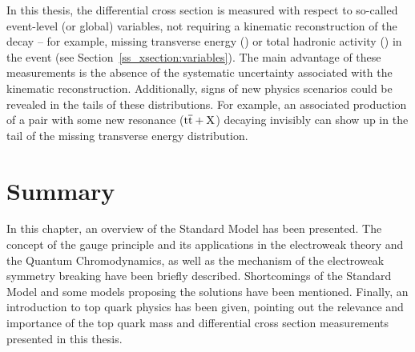 In this thesis, the \ttbar differential cross section is measured with respect to so-called event-level (or global)
variables, not requiring a kinematic reconstruction of the \ttbar decay -- for example, missing transverse energy (\MET)
or total hadronic activity (\HT) in the event (see Section~\ref{ss_xsection:variables}). The main advantage of these
measurements is the absence of the systematic uncertainty associated with the kinematic reconstruction. Additionally,
signs of new physics scenarios could be revealed in the tails of these distributions. For example, an associated
production of a \ttbar pair with some new resonance ($\mathrm{t}\overline{\mathrm{t}}+\mathrm{X}$) decaying invisibly can show up in the tail of
the missing transverse energy distribution.

\section{Summary}
In this chapter, an overview of the Standard Model has been presented. The concept of the gauge principle and its
applications in the electroweak theory and the Quantum Chromodynamics, as well as the mechanism of the electroweak
symmetry breaking have been briefly described. Shortcomings of the Standard Model and some models proposing the
solutions have been mentioned. Finally, an introduction to top quark physics has been given, pointing out the relevance
and importance of the top quark mass and differential cross section measurements presented in this thesis.

